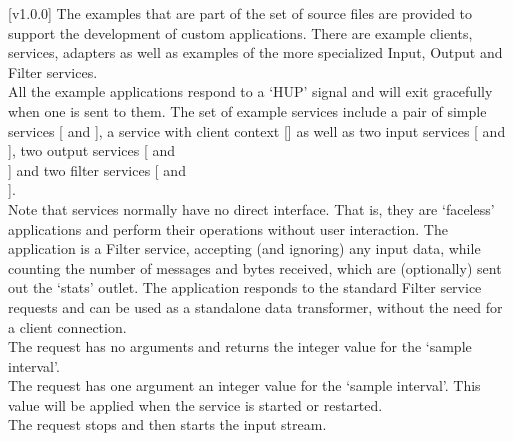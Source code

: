 [v1.0.0]
The examples that are part of the \mplusm{} set of source files are provided to support
the development of custom applications.
There are example clients, services, adapters as well as examples of the more specialized
Input, Output and Filter services.\\

All the example applications respond to a `HUP' signal and will exit gracefully when one
is sent to them.
The set of example services include a pair of simple services
[ and
], a service with client context
[] as well as two input services
[ and
], two output services
[ and\\
] and two filter services
[ and\\
].\\

Note that services normally have no direct interface.
That is, they are `faceless' applications and perform their operations without user
interaction.
The  application is a Filter
service, accepting (and ignoring) any input data, while counting the number of messages
and bytes received, which are (optionally) sent out the `stats' outlet.
The application responds to the standard Filter service requests and can be used as a
standalone data transformer, without the need for a client connection.\\

The  request has no arguments and
returns the integer value for the `sample interval'.\\

The  request has one argument
\longDash{} an integer value for the `sample interval'.
This value will be applied when the service is started or restarted.\\

The  request stops and then
starts the input stream.\\

